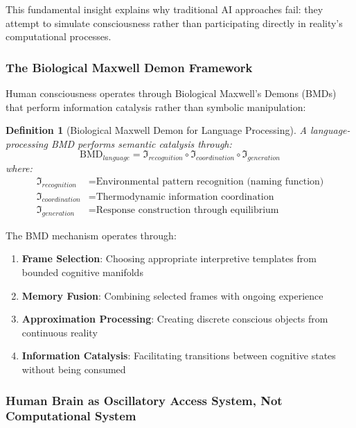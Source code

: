 \documentclass[12pt,a4paper]{article}
\newtheorem{definition}{Definition}
\begin{document}
This fundamental insight explains why traditional AI approaches fail: they attempt to simulate consciousness rather than participating directly in reality's computational processes.

\subsubsection{The Biological Maxwell Demon Framework}

Human consciousness operates through Biological Maxwell's Demons (BMDs) that perform information catalysis rather than symbolic manipulation:

\begin{definition}[Biological Maxwell Demon for Language Processing]
A language-processing BMD performs semantic catalysis through:
\begin{equation}
\text{BMD}_{language} = \mathfrak{I}_{recognition} \circ \mathfrak{I}_{coordination} \circ \mathfrak{I}_{generation}
\end{equation}
where:
\begin{align}
\mathfrak{I}_{recognition} &= \text{Environmental pattern recognition (naming function)} \\
\mathfrak{I}_{coordination} &= \text{Thermodynamic information coordination} \\
\mathfrak{I}_{generation} &= \text{Response construction through equilibrium}
\end{align}
\end{definition}

The BMD mechanism operates through:
\begin{enumerate}
\item \textbf{Frame Selection}: Choosing appropriate interpretive templates from bounded cognitive manifolds
\item \textbf{Memory Fusion}: Combining selected frames with ongoing experience
\item \textbf{Approximation Processing}: Creating discrete conscious objects from continuous reality
\item \textbf{Information Catalysis}: Facilitating transitions between cognitive states without being consumed
\end{enumerate}

\subsubsection{Human Brain as Oscillatory Access System, Not Computational System}
\end{document}
